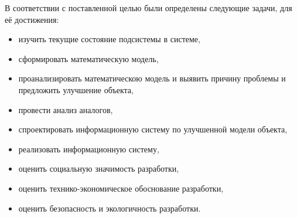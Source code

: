 В соответствии с поставленной целью были определены следующие задачи, для её достижения:
\begin{itemize}
    \item изучить текущие состояние подсистемы в системе,
    \item сформировать математическую модель,
    \item проанализировать математическою модель и выявить причину проблемы и предложить улучшение объекта, 
    \item провести анализ аналогов, 
    \item спроектировать информационную систему по улучшенной модели объекта,
    \item реализовать информационную систему,
    \item оценить социальную значимость разработки,  
    \item оценить технико-экономическое обоснование разработки,
    \item оценить безопасность и экологичность разработки.
\end{itemize}

 
\pagebreak